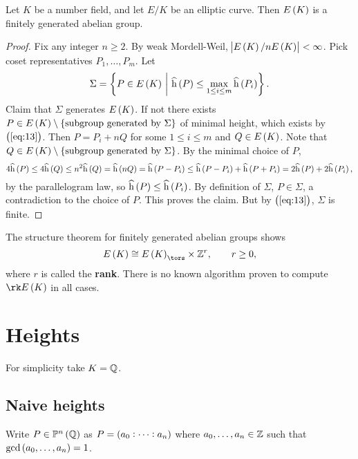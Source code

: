 \begin{theorem}
Let $ K $ be a number field, and let $ E / K $ be an elliptic curve. Then $ E\br{K} $ is a finitely generated abelian group.
\end{theorem}

\begin{proof}
Fix any integer $ n \ge 2 $. By weak Mordell-Weil, $ \abs{E\br{K} / nE\br{K}} < \infty $. Pick coset representatives $ P_1, \dots, P_m $. Let
$$ \Sigma = \cbr{P \in E\br{K} \st \widehat{\h}\br{P} \le \max_{1 \le i \le m} \widehat{\h}\br{P_i}}. $$
Claim that $ \Sigma $ generates $ E\br{K} $. If not there exists $ P \in E\br{K} \setminus \cbr{\text{subgroup generated by} \ \Sigma} $ of minimal height, which exists by $ \br{\ref{eq:13}} $. Then $ P = P_i + nQ $ for some $ 1 \le i \le m $ and $ Q \in E\br{K} $. Note that $ Q \in E\br{K} \setminus \cbr{\text{subgroup generated by} \ \Sigma} $. By the minimal choice of $ P $,
$$ 4\widehat{\h}\br{P} \le 4\widehat{\h}\br{Q} \le n^2\widehat{\h}\br{Q} = \widehat{\h}\br{nQ} = \widehat{\h}\br{P - P_i} \le \widehat{\h}\br{P - P_i} + \widehat{\h}\br{P + P_i} = 2\widehat{\h}\br{P} + 2\widehat{\h}\br{P_i}, $$
by the parallelogram law, so $ \widehat{\h}\br{P} \le \widehat{\h}\br{P_i} $. By definition of $ \Sigma $, $ P \in \Sigma $, a contradiction to the choice of $ P $. This proves the claim. But by $ \br{\ref{eq:13}} $, $ \Sigma $ is finite.
\end{proof}


\begin{remark*}
The structure theorem for finitely generated abelian groups shows
$$ E\br{K} \cong E\br{K}_{\tors} \times \ZZ^r, \qquad r \ge 0, $$
where $ r $ is called the \textbf{rank}. There is no known algorithm proven to compute $ \rk E\br{K} $ in all cases.
\end{remark*}

\pagebreak

\section{Heights}

For simplicity take $ K = \mathbb{Q} $.

\subsection{Naive heights}

Write $ P \in \PP^n\br{\QQ} $ as $ P = \br{a_0 : \dots : a_n} $ where $ a_0, \dots, a_n \in \mathbb{Z} $ such that $ \gcd\br{a_0, \dots, a_n} = 1 $.

